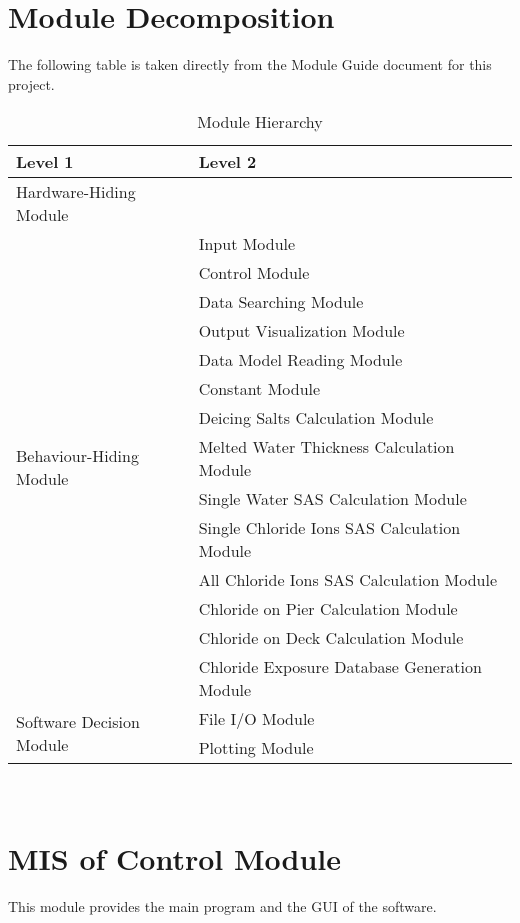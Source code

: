 \documentclass[12pt, titlepage]{article}
\begin{document}
\section{Module Decomposition}

The following table is taken directly from the Module Guide document for this project.
\begin{table}[h!]
\centering
\begin{tabular}{p{} p{}}
\toprule
\textbf{Level 1} & \textbf{Level 2}\\
\midrule

{Hardware-Hiding Module} & ~ \\
\midrule

\multirow{14}{0.3\textwidth}{Behaviour-Hiding Module} & Input Module\\
& Control Module\\
& Data Searching Module\\
& Output Visualization Module\\
& Data Model Reading Module \\
& Constant Module \\
& Deicing Salts Calculation Module \\
& Melted Water Thickness Calculation Module \\
& Single Water SAS Calculation Module \\
& Single Chloride Ions SAS Calculation Module \\
& All Chloride Ions SAS Calculation Module \\
& Chloride on Pier Calculation Module \\
& Chloride on Deck Calculation Module \\
& Chloride Exposure Database Generation Module\\
\midrule

\multirow{2}{0.3\textwidth}{Software Decision Module} &  File I/O Module \\
& Plotting Module \\
\bottomrule

\end{tabular}
\caption{Module Hierarchy}
\label{TblMH}
\end{table}
\newpage
~\newpage

\section{MIS of Control Module} \label{controlModule} 
This module provides the main program and the GUI of the software.
\end{document}
